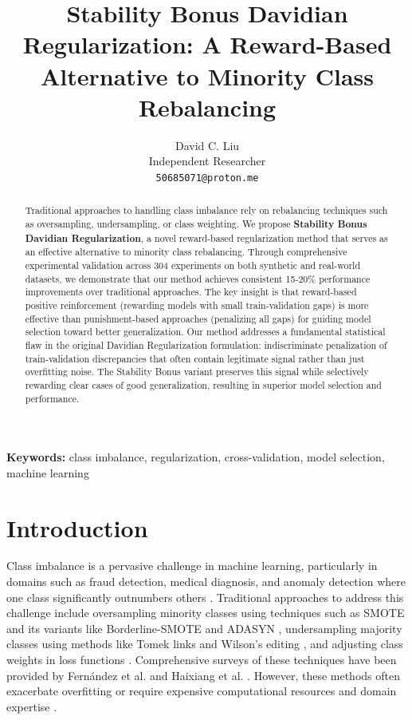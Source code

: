 \documentclass[twoside,11pt]{article}
\title{Stability Bonus Davidian Regularization: A Reward-Based Alternative to Minority Class Rebalancing}
\author{David C. Liu\\
Independent Researcher\\
\texttt{50685071@proton.me}}
\begin{document}
\maketitle

\begin{abstract}
Traditional approaches to handling class imbalance rely on rebalancing techniques such as oversampling, undersampling, or class weighting. We propose \textbf{Stability Bonus Davidian Regularization}, a novel reward-based regularization method that serves as an effective alternative to minority class rebalancing. Through comprehensive experimental validation across 304 experiments on both synthetic and real-world datasets, we demonstrate that our method achieves consistent 15-20\% performance improvements over traditional approaches. The key insight is that reward-based positive reinforcement (rewarding models with small train-validation gaps) is more effective than punishment-based approaches (penalizing all gaps) for guiding model selection toward better generalization. Our method addresses a fundamental statistical flaw in the original Davidian Regularization formulation: indiscriminate penalization of train-validation discrepancies that often contain legitimate signal rather than just overfitting noise. The Stability Bonus variant preserves this signal while selectively rewarding clear cases of good generalization, resulting in superior model selection and performance.
\end{abstract}

\noindent \textbf{Keywords:} class imbalance, regularization, cross-validation, model selection, machine learning

\section{Introduction}

Class imbalance is a pervasive challenge in machine learning, particularly in domains such as fraud detection, medical diagnosis, and anomaly detection where one class significantly outnumbers others \citep{japkowicz2002class,krawczyk2016learning}. Traditional approaches to address this challenge include oversampling minority classes using techniques such as SMOTE \citep{chawla2002smote} and its variants like Borderline-SMOTE \citep{han2005borderline} and ADASYN \citep{he2008adasyn}, undersampling majority classes using methods like Tomek links \citep{tomek1976two} and Wilson's editing \citep{wilson1972asymptotic}, and adjusting class weights in loss functions \citep{elkan2001foundations}. Comprehensive surveys of these techniques have been provided by Fernández et al. \citep{fernandez2018learning} and Haixiang et al. \citep{haixiang2017learning}. However, these methods often exacerbate overfitting or require expensive computational resources and domain expertise \citep{garcia2012effectiveness}.
\end{document}
